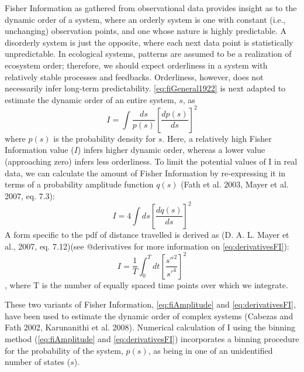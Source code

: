 \documentclass[12pt,twoside]{reedthesis}
\begin{document}
Fisher Information as gathered from observational data provides insight
as to the dynamic order of a system, where an orderly system is one with
constant (i.e., unchanging) observation points, and one whose nature is
highly predictable. A disorderly system is just the opposite, where each
next data point is statistically unpredictable. In ecological systems,
patterns are assumed to be a realization of ecosystem order; therefore,
we should expect orderliness in a system with relatively stable
processes and feedbacks. Orderliness, however, does not necessarily
infer long-term predictability. \eqref{eq:fiGeneral1922} is next adapted
to estimate the dynamic order of an entire system, \(s\), as
\begin{equation} 
I = \int \frac{ds}{p(s)}\left[\frac{dp(s)}{ds}\right]^2
\label{eq:fiAdapted}
\end{equation}
where \(p(s)\) is the probability density for \(s\). Here, a relatively
high Fisher Information value (\(I\)) infers higher dynamic order,
whereas a lower value (approaching zero) infers less orderliness. To
limit the potential values of I in real data, we can calculate the
amount of Fisher Information by re-expressing it in terms of a
probability amplitude function \(q(s)\) (Fath et al. 2003, Mayer et al.
2007, eq. 7.3):
\begin{equation}
I = 4 \int ds\left[\frac{dq(s)}{ds}\right]^2
\label{eq:fiAmplitude}
\end{equation}
A form specific to the pdf of distance travelled is derived as (D. A. L.
Mayer et al., 2007, eq. 7.12)(see @derivatives for more information on
\eqref{eq:derivativesFI}):
\begin{equation} 
\label{eq:derivativesFI}
I = \frac{1}{T} \int_0^T dt\left[\frac{s''^2}{s'^4}\right]^2
\end{equation}
, where T is the number of equally spaced time points over which we
integrate.

These two variants of Fisher Information, \eqref{eq:fiAmplitude} and
\eqref{eq:derivativesFI}, have been used to estimate the dynamic order of
complex systems (Cabezas and Fath 2002, Karunanithi et al. 2008).
Numerical calculation of I using the binning method
(\eqref{eq:fiAmplitude} and \eqref{eq:derivativesFI}) incorporates a binning
procedure for the probability of the system, \(p(s)\), as being in one
of an unidentified number of states (\(s\)).
\end{document}
